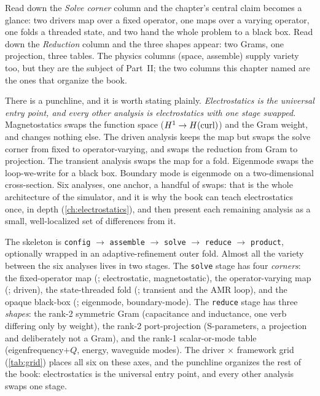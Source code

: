 Read down the \emph{Solve corner} column and the chapter's central claim becomes
a glance: two drivers map over a fixed operator, one maps over a varying
operator, one folds a threaded state, and two hand the whole problem to a black
box. Read down the \emph{Reduction} column and the three shapes appear: two
Grams, one projection, three tables. The physics columns (space, assemble)
supply variety too, but they are the subject of Part~II; the two columns this
chapter named are the ones that organize the book.

There is a punchline, and it is worth stating plainly. \emph{Electrostatics is
the universal entry point, and every other analysis is electrostatics with one
stage swapped.} Magnetostatics swaps the function space ($H^1\to H(\mathrm{curl})$) and
the Gram weight, and changes nothing else. The driven analysis keeps the map but
swaps the solve corner from fixed to operator-varying, and swaps the reduction
from Gram to projection. The transient analysis swaps the map for a fold.
Eigenmode swaps the loop-we-write for a black box. Boundary mode is eigenmode on
a two-dimensional cross-section. Six analyses, one anchor, a handful of swaps:
that is the whole architecture of the simulator, and it is why the book can
teach electrostatics once, in depth (\cref{ch:electrostatics}), and then present
each remaining analysis as a small, well-localized set of differences from it.

\summarysection
The skeleton is
\texttt{config} $\to$ \texttt{assemble} $\to$ \texttt{solve} $\to$
\texttt{reduce} $\to$ \texttt{product},
optionally wrapped in an adaptive-refinement outer fold. Almost all the variety
between the six analyses lives in two stages. The \texttt{solve} stage has four
\emph{corners}: the fixed-operator map (; electrostatic,
magnetostatic), the operator-varying map (; driven), the
state-threaded fold (; transient and the AMR loop), and the
opaque black-box (; eigenmode, boundary-mode). The \texttt{reduce}
stage has three \emph{shapes}: the rank-2 symmetric Gram (capacitance and
inductance, one verb differing only by weight), the rank-2 port-projection
(S-parameters, a projection and deliberately not a Gram), and the rank-1
scalar-or-mode table (eigenfrequency$+Q$, energy, waveguide modes). The driver
$\times$ framework grid (\cref{tab:grid}) places all six on these axes, and the
punchline organizes the rest of the book: electrostatics is the universal entry
point, and every other analysis swaps one stage.

